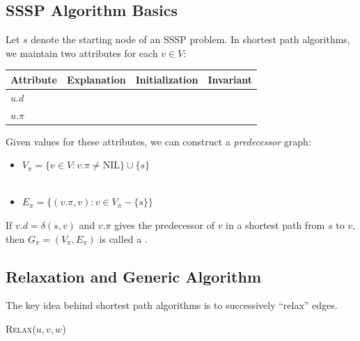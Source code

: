 \documentclass[11  pt]{exam}
\begin{document}
	\newpage
	\subsection{SSSP Algorithm Basics}
	Let $s$ denote the starting node of an SSSP problem. In shortest path algorithms, we maintain two attributes for each $v \in V$: \\
	
	
	\begin{tabular}{| l | p{4.5cm} | p{4.5cm} | p{4.5cm} |}
		\hline
		\textbf{Attribute} & \textbf{Explanation} & \textbf{Initialization} & \textbf{Invariant} \\
		\hline
		$u.d$ & \phantom{the best guess for the distance from $s$ to $u$} \newline &  \phantom{$s.d = 0$;} \newline \phantom{$u.d = \infty$ for $u \neq s$} & \phantom{We will always maintain:  $u.d \geq \delta(s,d)$} \\
		\hline
		$u.\pi$ \newline &  \phantom{the predecessor of $u$ in a path from $s$ to $u$ dfasdfsfd}\newline \phantom{the predecessor of $u$ in a path from $s$ to $u$ dfasdfsfd} &  & \\
		\hline
	\end{tabular}
	
	\vs{2cm}
	
	Given values for these attributes, we can construct a \emph{predecessor} graph:
	\begin{itemize}
		\item $V_\pi = \{ v \in V \colon v.\pi \neq \text{NIL}\} \cup \{s\}$ \\\
		\item $E_\pi = \{(v.\pi, v) \colon v \in V_\pi - \{s\}\}$
	\end{itemize}
	
	
	If $v.d = \delta(s,v)$ and $v.\pi$ gives the predecessor of $v$ in a shortest path from $s$ to $v$, then $G_\pi = (V_\pi, E_\pi)$ is called a .
	
	\vs{3cm}
	
	
	
	\newpage
	
	\subsection{Relaxation and Generic Algorithm}
	The key idea behind shortest path algorithms is to successively ``relax'' edges.
	\begin{algorithm}
		\textsc{Relax}($u,v,w$)
		\begin{algorithmic}
			\State 
			\State
			\State
			\State
			\EndIf
		\end{algorithmic}
	\end{algorithm}
	
\end{document}
